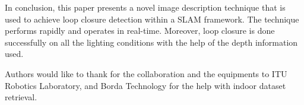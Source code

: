 \documentclass[]{spie}  %
\begin{document}
In conclusion, this paper presents a novel image description technique that is used to achieve loop closure detection within a SLAM framework. The technique performs rapidly and operates in real-time. Moreover, loop closure is done successfully on all the lighting conditions with the help of the depth information used.


\acknowledgments         

Authors would like to thank for the collaboration and the equipments to ITU Robotics Laboratory, and Borda Technology for the help with indoor dataset retrieval.
\end{document}
